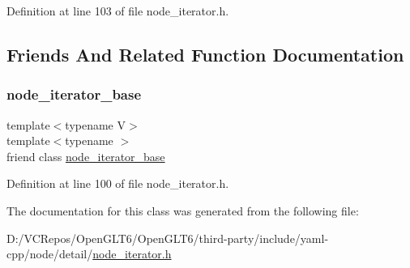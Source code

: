Definition at line 103 of file node\+\_\+iterator.\+h.



\subsection{Friends And Related Function Documentation}
\mbox{\label{class_y_a_m_l_1_1detail_1_1node__iterator__base_af888868b67b8d48112c86fd093ebd2a1}} 
\subsubsection{\texorpdfstring{node\_iterator\_base}{node\_iterator\_base}}
{\footnotesize\ttfamily template$<$typename V$>$ \\
template$<$typename $>$ \\
friend class \mbox{\hyperlink{class_y_a_m_l_1_1detail_1_1node__iterator__base}{node\+\_\+iterator\+\_\+base}}\hspace{0.3cm}{\ttfamily [friend]}}



Definition at line 100 of file node\+\_\+iterator.\+h.



The documentation for this class was generated from the following file\+:\begin{DoxyCompactItemize}
\item 
D\+:/\+V\+C\+Repos/\+Open\+G\+L\+T6/\+Open\+G\+L\+T6/third-\/party/include/yaml-\/cpp/node/detail/\mbox{\hyperlink{node__iterator_8h}{node\+\_\+iterator.\+h}}\end{DoxyCompactItemize}
